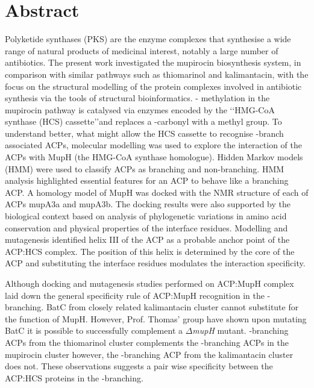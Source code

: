 \chapter*{Abstract}

Polyketide synthases (PKS) are the enzyme complexes that synthesise a wide range of natural products of medicinal interest, notably a large number of antibiotics. The present work investigated the mupirocin biosynthesis system, in comparison with similar pathways such as thiomarinol and kalimantacin, with the focus on the structural modelling of the protein complexes involved in antibiotic synthesis via the tools of structural bioinformatics. \bet - methylation in the mupirocin pathway is catalysed via enzymes encoded by the \lq\lq HMG-CoA synthase (HCS) cassette\rq\rq and replaces a \bet-carbonyl with a methyl group. To understand better, what might allow the HCS cassette to recognise \bet-branch associated ACPs, molecular modelling was used to explore the interaction of the ACPs with MupH (the HMG-CoA synthase homologue). Hidden Markov models (HMM) were used to classify ACPs as branching and non-branching. HMM analysis highlighted essential features for an ACP to behave like a branching ACP. A homology model of MupH was docked with the NMR structure of each of ACPs mupA3a and mupA3b. The docking results were also supported by the biological context based on analysis of phylogenetic variations in amino acid conservation and physical properties of the interface residues. Modelling and mutagenesis identified helix III of the ACP as a probable anchor point of the ACP:HCS complex. The position of this helix is determined by the core of the ACP and substituting the interface residues modulates the interaction specificity. 
%

Although docking and mutagenesis studies performed on ACP:MupH complex laid down the general specificity rule of ACP:MupH recognition in the \bet-branching. BatC from closely related kalimantacin cluster cannot substitute for the function of MupH. However, Prof. Thomas' group have shown upon mutating BatC it is possible to successfully complement a $ \Delta $\textit{mupH} mutant. \bet-branching ACPs from the thiomarinol cluster complements the \bet-branching ACPs in the mupirocin cluster however, the \bet-branching ACP from the kalimantacin cluster does not. These observations suggests a pair wise specificity between the ACP:HCS proteins in the \bet-branching. 

